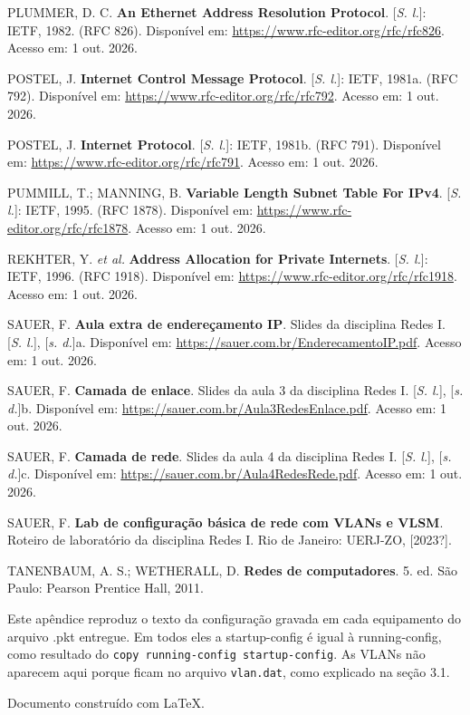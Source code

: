 PLUMMER, D. C. \textbf{An Ethernet Address Resolution Protocol}. [\emph{S. l.}]: IETF, 1982. (RFC 826). Disponível em: \url{https://www.rfc-editor.org/rfc/rfc826}. Acesso em: 1 out. 2026.

POSTEL, J. \textbf{Internet Control Message Protocol}. [\emph{S. l.}]: IETF, 1981a. (RFC 792). Disponível em: \url{https://www.rfc-editor.org/rfc/rfc792}. Acesso em: 1 out. 2026.

POSTEL, J. \textbf{Internet Protocol}. [\emph{S. l.}]: IETF, 1981b. (RFC 791). Disponível em: \url{https://www.rfc-editor.org/rfc/rfc791}. Acesso em: 1 out. 2026.

PUMMILL, T.; MANNING, B. \textbf{Variable Length Subnet Table For IPv4}. [\emph{S. l.}]: IETF, 1995. (RFC 1878). Disponível em: \url{https://www.rfc-editor.org/rfc/rfc1878}. Acesso em: 1 out. 2026.

REKHTER, Y. \emph{et al.} \textbf{Address Allocation for Private Internets}. [\emph{S. l.}]: IETF, 1996. (RFC 1918). Disponível em: \url{https://www.rfc-editor.org/rfc/rfc1918}. Acesso em: 1 out. 2026.

SAUER, F. \textbf{Aula extra de endereçamento IP}. Slides da disciplina Redes I. [\emph{S. l.}], [\emph{s. d.}]a. Disponível em: \url{https://sauer.com.br/EnderecamentoIP.pdf}. Acesso em: 1 out. 2026.

SAUER, F. \textbf{Camada de enlace}. Slides da aula 3 da disciplina Redes I. [\emph{S. l.}], [\emph{s. d.}]b. Disponível em: \url{https://sauer.com.br/Aula3RedesEnlace.pdf}. Acesso em: 1 out. 2026.

SAUER, F. \textbf{Camada de rede}. Slides da aula 4 da disciplina Redes I. [\emph{S. l.}], [\emph{s. d.}]c. Disponível em: \url{https://sauer.com.br/Aula4RedesRede.pdf}. Acesso em: 1 out. 2026.

SAUER, F. \textbf{Lab de configuração básica de rede com VLANs e VLSM}. Roteiro de laboratório da disciplina Redes I. Rio de Janeiro: UERJ-ZO, [2023?].

TANENBAUM, A. S.; WETHERALL, D. \textbf{Redes de computadores}. 5. ed. São Paulo: Pearson Prentice Hall, 2011.\par
\endgroup

\clearpage
{}

Este apêndice reproduz o texto da configuração gravada em cada equipamento do arquivo .pkt entregue. Em todos eles a startup-config é igual à running-config, como resultado do \texttt{copy running-config startup-config}. As VLANs não aparecem aqui porque ficam no arquivo \texttt{vlan.dat}, como explicado na seção 3.1.



\clearpage
{}



\vspace{10pt}
{\small Documento construído com LaTeX.}


